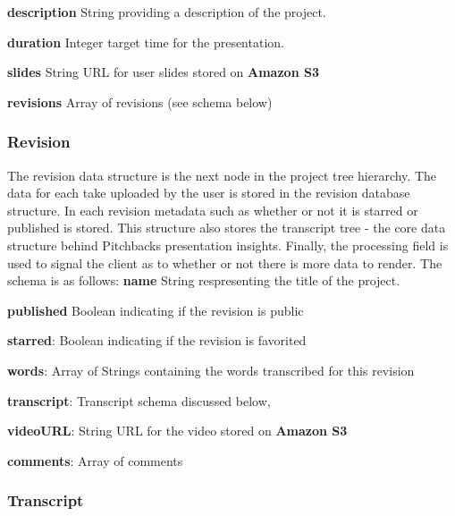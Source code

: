 \textbf{description} String providing a description of the project.

\textbf{duration} Integer target time for the presentation.

\textbf{slides} String URL for user slides stored on \textbf{Amazon S3}

\textbf{revisions} Array of revisions (see schema below)

\subsubsection*{Revision}

The revision data structure is the next node in the project tree hierarchy. The
data for each take uploaded by the user is stored in the revision database
structure. In each revision metadata such as whether or not it is starred or
published is stored. This structure also stores the transcript tree - the core
data structure behind Pitchbacks presentation insights. Finally, the processing
field is used to signal the client as to whether or not there is more data to
render. The schema is as follows: \textbf{name} String respresenting the title
of the project.

\textbf{published} Boolean indicating if the revision is public

\textbf{starred}: Boolean indicating if the revision is favorited

\textbf{words}: Array of Strings containing the words transcribed for this revision

\textbf{transcript}: Transcript schema discussed below,

\textbf{videoURL}: String URL for the video stored on \textbf{Amazon S3}

\textbf{comments}: Array of comments

\subsubsection*{Transcript}

